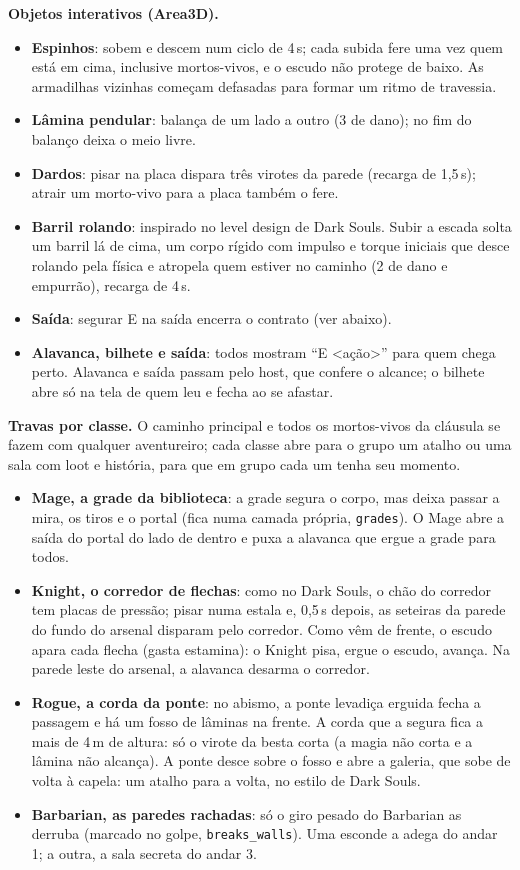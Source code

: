 \documentclass[11pt,a4paper]{article}
\begin{document}
\textbf{Objetos interativos (Area3D).}
\begin{itemize}
    \item \textbf{Espinhos}: sobem e descem num ciclo de 4\,s; cada subida fere uma vez quem está em cima, inclusive mortos-vivos, e o escudo não protege de baixo. As armadilhas vizinhas começam defasadas para formar um ritmo de travessia.
    \item \textbf{Lâmina pendular}: balança de um lado a outro (3 de dano); no fim do balanço deixa o meio livre.
    \item \textbf{Dardos}: pisar na placa dispara três virotes da parede (recarga de 1,5\,s); atrair um morto-vivo para a placa também o fere.
    \item \textbf{Barril rolando}: inspirado no level design de Dark Souls. Subir a escada solta um barril lá de cima, um corpo rígido com impulso e torque iniciais que desce rolando pela física e atropela quem estiver no caminho (2 de dano e empurrão), recarga de 4\,s.
    \item \textbf{Saída}: segurar E na saída encerra o contrato (ver abaixo).
    \item \textbf{Alavanca, bilhete e saída}: todos mostram ``E <ação>'' para quem chega perto. Alavanca e saída passam pelo host, que confere o alcance; o bilhete abre só na tela de quem leu e fecha ao se afastar.
\end{itemize}

\textbf{Travas por classe.} O caminho principal e todos os mortos-vivos da cláusula se fazem com qualquer aventureiro; cada classe abre para o grupo um atalho ou uma sala com loot e história, para que em grupo cada um tenha seu momento.
\begin{itemize}
    \item \textbf{Mage, a grade da biblioteca}: a grade segura o corpo, mas deixa passar a mira, os tiros e o portal (fica numa camada própria, \texttt{grades}). O Mage abre a saída do portal do lado de dentro e puxa a alavanca que ergue a grade para todos.
    \item \textbf{Knight, o corredor de flechas}: como no Dark Souls, o chão do corredor tem placas de pressão; pisar numa estala e, 0,5\,s depois, as seteiras da parede do fundo do arsenal disparam pelo corredor. Como vêm de frente, o escudo apara cada flecha (gasta estamina): o Knight pisa, ergue o escudo, avança. Na parede leste do arsenal, a alavanca desarma o corredor.
    \item \textbf{Rogue, a corda da ponte}: no abismo, a ponte levadiça erguida fecha a passagem e há um fosso de lâminas na frente. A corda que a segura fica a mais de 4\,m de altura: só o virote da besta corta (a magia não corta e a lâmina não alcança). A ponte desce sobre o fosso e abre a galeria, que sobe de volta à capela: um atalho para a volta, no estilo de Dark Souls.
    \item \textbf{Barbarian, as paredes rachadas}: só o giro pesado do Barbarian as derruba (marcado no golpe, \texttt{breaks\_walls}). Uma esconde a adega do andar 1; a outra, a sala secreta do andar 3.
\end{itemize}
\end{document}
